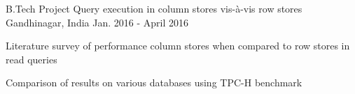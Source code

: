 \begin{cventries}
  \cventry
    {B.Tech Project}
    {Query execution in column stores vis-à-vis row stores}
    {Gandhinagar, India}
    {Jan. 2016 - April 2016}
    {
      \begin{cvitems}
        \item {Literature survey of performance column stores when compared to row stores in read queries}
        \item {Comparison of results on various databases using TPC-H benchmark}
      \end{cvitems}
    }
\end{cventries}
